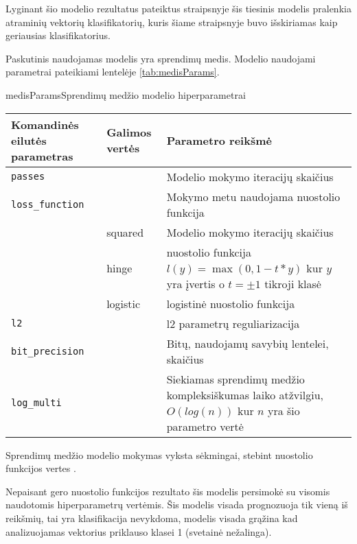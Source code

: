 
Lyginant šio modelio rezultatus pateiktus \cite{comp} straipsnyje šis tiesinis modelis pralenkia
atraminių vektorių klasifikatorių, kuris šiame straipsnyje buvo išskiriamas kaip geriausias klasifikatorius.



Paskutinis naudojamas modelis yra sprendimų medis. Modelio naudojami parametrai pateikiami lentelėje \vref{tab:medisParams}.

\begin{ktutable}{medisParams}{Sprendimų medžio modelio hiperparametrai}
    \begin{tabular}{| l | l | p{7cm}|}
    \hline
        Komandinės eilutės parametras & Galimos vertės & Parametro reikšmė\\ \hline
        \texttt{passes} &  & Modelio mokymo iteracijų skaičius \\ \hline
        \texttt{loss\_function} &          & Mokymo metu naudojama nuostolio funkcija \\
                               & squared  & Modelio mokymo iteracijų skaičius \\
                               & hinge    & nuostolio funkcija $l(y) = \max(0, 1 - t * y)$ kur $y$ yra įvertis o $t = \pm 1$ tikroji klasė  \\
                               & logistic & logistinė nuostolio funkcija \\ \hline
        \texttt{l2} & & l2 parametrų reguliarizacija \\ \hline
        \texttt{bit\_precision} & & Bitų, naudojamų savybių lentelei, skaičius\\ \hline
        \texttt{log\_multi} & & Siekiamas sprendimų medžio kompleksiškumas laiko atžvilgiu, $O(log(n))$ kur $n$ yra šio parametro vertė\\ \hline
    \end{tabular}
\end{ktutable}

Sprendimų medžio modelio mokymas vyksta sėkmingai, stebint nuostolio funkcijos vertes .

Nepaisant gero nuostolio funkcijos rezultato šis modelis persimokė su visomis naudotomis
hiperparametrų vertėmis. Šis modelis visada prognozuoja tik vieną iš reikšmių, tai yra
klasifikacija nevykdoma, modelis visada grąžina kad analizuojamas vektorius priklauso klasei 1 (svetainė nežalinga).

